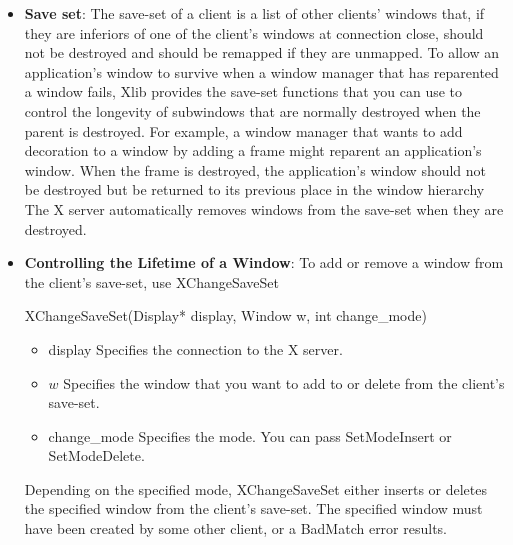 \documentclass{report}
\begin{document}
\begin{itemize}
\begin{itemize}
                \item The new parent is InputOnly, and the window is not.
                \item The specified window has a ParentRelative background, and the new parent window is not the same depth as the specified window.
            \end{itemize}
            XReparentWindow can generate BadMatch and BadWindow errors.
        \item \textbf{Save set}: The save-set of a client is a list of other clients’ windows that, if they are inferiors of one of the client’s windows at connection close, should not be destroyed and should be remapped if they are unmapped. 
            \bigbreak \noindent 
            To allow an application’s window to survive when a window manager that has reparented a window fails, Xlib provides the save-set functions that you can use to control the longevity of subwindows that are normally destroyed when the parent is destroyed. For example, a window manager that wants to add decoration to a window by adding a frame might reparent an application’s window. When the frame is destroyed, the application’s window should not be destroyed but be returned to its previous place in the window hierarchy
            \bigbreak \noindent 
            The X server automatically removes windows from the save-set when they are destroyed.
        \item \textbf{Controlling the Lifetime of a Window}: To add or remove a window from the client’s save-set, use XChangeSaveSet
            \bigbreak \noindent 
            \begin{cppcode}
                XChangeSaveSet(Display* display, Window w, int change_mode)
            \end{cppcode}
            \begin{itemize}
                \item display Specifies the connection to the X server.
                \item $w$ Specifies the window that you want to add to or delete from the client’s save-set.
                \item change\_mode Specifies the mode. You can pass SetModeInsert or SetModeDelete.
            \end{itemize}
            Depending on the specified mode, XChangeSaveSet either inserts or deletes the specified window from the client’s save-set. The specified window must have been created by some other client, or a BadMatch error results.

\end{itemize}
\end{document}
